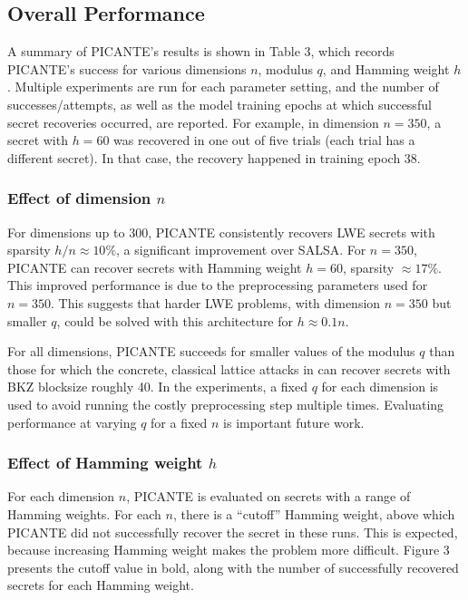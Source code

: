 \documentclass{article}
\begin{document}
\subsection{Overall Performance}

A summary of PICANTE’s results is shown in Table 3, which records PICANTE’s success for various dimensions \( n \), modulus \( q \), and Hamming weight \( h \). Multiple experiments are run for each parameter setting, and the number of successes/attempts, as well as the model training epochs at which successful secret recoveries occurred, are reported. For example, in dimension \( n = 350 \), a secret with \( h = 60 \) was recovered in one out of five trials (each trial has a different secret). In that case, the recovery happened in training epoch 38.

\subsubsection{Effect of dimension \( n \)}

For dimensions up to 300, PICANTE consistently recovers LWE secrets with sparsity \( h/n \approx 10\% \), a significant improvement over SALSA. For \( n = 350 \), PICANTE can recover secrets with Hamming weight \( h = 60 \), sparsity \( \approx 17\% \). This improved performance is due to the preprocessing parameters used for \( n = 350 \). This suggests that harder LWE problems, with dimension \( n = 350 \) but smaller \( q \), could be solved with this architecture for \( h \approx 0.1n \).

For all dimensions, PICANTE succeeds for smaller values of the modulus \( q \) than those for which the concrete, classical lattice attacks in \cite{12} can recover secrets with BKZ blocksize roughly 40. In the experiments, a fixed \( q \) for each dimension is used to avoid running the costly preprocessing step multiple times. Evaluating performance at varying \( q \) for a fixed \( n \) is important future work.

\subsubsection{Effect of Hamming weight \( h \)}

For each dimension \( n \), PICANTE is evaluated on secrets with a range of Hamming weights. For each \( n \), there is a “cutoff” Hamming weight, above which PICANTE did not successfully recover the secret in these runs. This is expected, because increasing Hamming weight makes the problem more difficult. Figure 3 presents the cutoff value in bold, along with the number of successfully recovered secrets for each Hamming weight.
\end{document}
